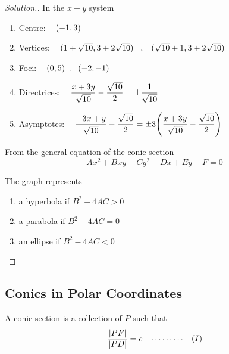 \documentclass[11pt,a4paper]{article}
\theoremstyle{definition}
\newenvironment{solution}
  {\renewcommand{\qedsymbol}{}\begin{proof}[\textit{Solution}.]}
  {\end{proof}}
\begin{document}
\begin{solution}
In the $x-y$ system
\begin{enumerate}
\item[] Centre: $\hspace{0.3cm} (-1,3)$

\item[] Vertices: $\hspace{0.3cm} (1+\sqrt{10}, 3+2\sqrt{10})\hspace{0.3cm},\hspace{0.3cm} (\sqrt{10} + 1, 3 + 2\sqrt{10})$

\item[] Foci: $\hspace{0.3cm} (0,5)\hspace{0.2cm},\hspace{0.2cm} (-2,-1)$

\item[] Directrices: $\hspace{0.3cm} \dfrac{x + 3y}{\sqrt{10}} - \dfrac{\sqrt{10}}{2} = \pm \dfrac{1}{\sqrt{10}}$

\item[] Asymptotes: $\hspace{0.3cm} \dfrac{-3x + y}{\sqrt{10}} - \dfrac{\sqrt{10}}{2}  = \pm 3\Bigg(\dfrac{x + 3y}{\sqrt{10}} - \dfrac{\sqrt{10}}{2}\Bigg)$
\end{enumerate}

From the general equation of the conic section $$Ax^2 + Bxy + Cy^2 + Dx + Ey + F = 0$$

The graph represents
\begin{enumerate}
\item a hyperbola if $B^2 - 4AC > 0$
\item a parabola if $B^2 - 4AC = 0$
\item an ellipse if $B^2 - 4AC <0$
\end{enumerate}

\vspace{1cm}
\end{solution}

\subsection{Conics in Polar Coordinates}

A conic section is a collection of $P$ such that $$\dfrac{\left|PF\right|
}{\left|PD\right|
} = e \hspace{0.3cm}\cdots\cdots\cdots\hspace{0.3cm} (I)  $$
\end{document}
